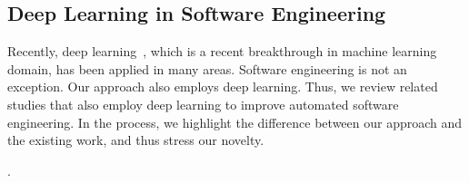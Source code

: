 
\subsection{Deep Learning in Software Engineering}\label{sec.deeplearning}

Recently, deep learning~\cite{Goodfellow-et-al-2016}, which is a recent breakthrough in machine learning domain, has been applied in many areas. Software engineering is not an exception. Our approach also employs deep learning. Thus, we review related studies that also employ deep learning to improve automated software engineering. In the process, we highlight the difference between our approach and the existing work, and thus stress our novelty.

.
